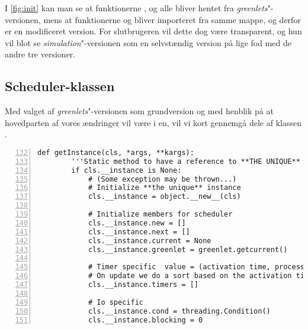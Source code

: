 I \cref{fig:init} kan man se at funktionerne ,  og  alle bliver hentet fra \emph{greenlets}"-versionen, mens at funktionerne  og  bliver importeret fra samme mappe, og derfor er en modificeret version. For slutbrugeren  vil dette dog være transparent, og hun vil blot se \emph{simulation}"-versionen som en selvstændig version på lige fod med de andre tre versioner.

\subsection{Scheduler-klassen}
Med valget af \emph{greenlets}"-versionen som grundversion og med henblik på at hovedparten af vores ændringer vil være i \sched en, vil vi kort gennemgå dele af klassen .

\begin{lstlisting}[firstnumber=132,stepnumber=5,numbers=left, float, label=fig:scheduling, caption=Uddrag af Scheduler.py i \emph{greenlets}versionen.]
    def getInstance(cls, *args, **kargs):
        '''Static method to have a reference to **THE UNIQUE** instance'''
        if cls.__instance is None:
            # (Some exception may be thrown...)
            # Initialize **the unique** instance
            cls.__instance = object.__new__(cls)

            # Initialize members for scheduler
            cls.__instance.new = []
            cls.__instance.next = []
            cls.__instance.current = None
            cls.__instance.greenlet = greenlet.getcurrent()

            # Timer specific  value = (activation time, process)
            # On update we do a sort based on the activation time
            cls.__instance.timers = []

            # Io specific
            cls.__instance.cond = threading.Condition()
            cls.__instance.blocking = 0
\end{lstlisting}

